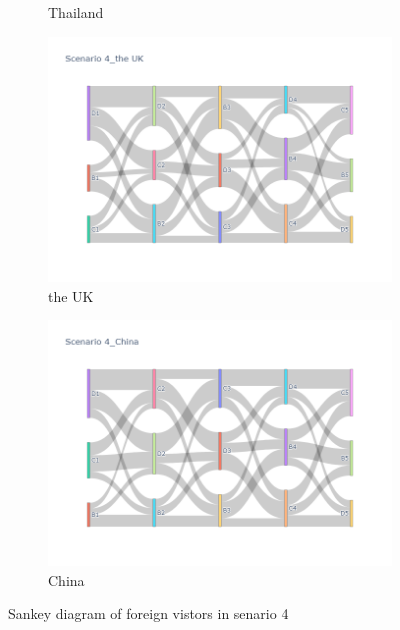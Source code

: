 \begin{figure}[h]
\begin{subfigure}{0.5\textwidth}
    \caption{Thailand}
  \end{subfigure}
  \begin{subfigure}{0.5\textwidth}
    \centering
    \includegraphics[width=\linewidth]{Figure/figure35d.png}
    \caption{the UK}
  \end{subfigure}
  \begin{subfigure}{0.5\textwidth}
    \centering
    \includegraphics[width=\linewidth]{Figure/figure36d.png}
    \caption{China}
  \end{subfigure}
  \caption{ Sankey diagram of foreign vistors in senario 4 }
  \label{fig35}
\end{figure}

